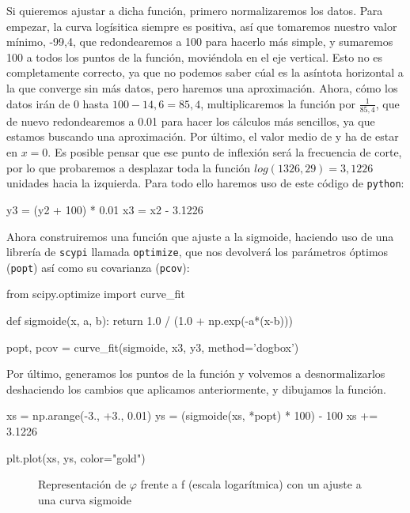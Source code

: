 \documentclass[12pt, a4paper, titlepage]{article}
\newcommand{\code}[1]{\texttt{#1}} %
\begin{document}
  Si quieremos ajustar a dicha función, primero normalizaremos los datos. Para empezar, la curva logísitica siempre es positiva, así que tomaremos nuestro valor mínimo, -99,4, que redondearemos a 100 para hacerlo más simple, y sumaremos 100 a todos los puntos de la función, moviéndola en el eje vertical. Esto no es completamente correcto, ya que no podemos saber cúal es la asíntota horizontal a la que converge sin más datos, pero haremos una aproximación. Ahora, cómo los datos irán de 0 hasta $100-14,6=85,4$, multiplicaremos la función por $\frac{1}{85,4}$, que de nuevo redondearemos a 0.01 para hacer los cálculos más sencillos, ya que estamos buscando una aproximación. Por último, el valor medio de y ha de estar en $x=0$. Es posible pensar que ese punto de inflexión será la frecuencia de corte, por lo que probaremos a desplazar toda la función $log(1326,29) = 3,1226$ unidades hacia la izquierda. Para todo ello haremos uso de este código de \code{python}:

  \begin{python}
    y3 = (y2 + 100) * 0.01
    x3 = x2 - 3.1226
  \end{python}

  Ahora construiremos una función que ajuste a la sigmoide, haciendo uso de una librería de \code{scypi} llamada \code{optimize}, que nos devolverá los parámetros óptimos (\code{popt}) así como su covarianza (\code{pcov}):

  \begin{python}
    from scipy.optimize import curve_fit

    def sigmoide(x, a, b):
        return 1.0 / (1.0 + np.exp(-a*(x-b)))

    popt, pcov = curve_fit(sigmoide, x3, y3, method='dogbox')
  \end{python}

  Por último, generamos los puntos de la función y volvemos a desnormalizarlos deshaciendo los cambios que aplicamos anteriormente, y dibujamos la función.

  \begin{python}
    xs = np.arange(-3., +3., 0.01)
    ys = (sigmoide(xs, *popt) * 100) - 100
    xs += 3.1226

    plt.plot(xs, ys, color="gold")
  \end{python}

  \begin{figure}[H]
    \hspace{2.5em} 
    \caption{Representación de $\varphi$ frente a f (escala logarítmica) con un ajuste a una curva sigmoide}
  \end{figure}
\end{document}
